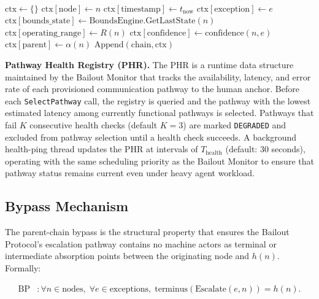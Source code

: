 \begin{algorithm}[htbp]
\begin{algorithmic}[1]
\EndProcedure
\\
  \State $\text{ctx} \leftarrow \{\}$
  \State $\text{ctx}[\text{node}] \leftarrow n$
  \State $\text{ctx}[\text{timestamp}] \leftarrow t_{\text{now}}$
  \State $\text{ctx}[\text{exception}] \leftarrow e$
  \State $\text{ctx}[\text{bounds\_state}] \leftarrow \text{BoundsEngine.GetLastState}(n)$
  \State $\text{ctx}[\text{operating\_range}] \leftarrow R(n)$
  \State $\text{ctx}[\text{confidence}] \leftarrow \text{confidence}(n, e)$
  \State $\text{ctx}[\text{parent}] \leftarrow \alpha(n)$
  \State $\text{Append}(\text{chain}, \text{ctx})$
\EndProcedure
\end{algorithmic}
\end{algorithm}

\medskip\noindent\textbf{Pathway Health Registry (PHR).} The PHR is a runtime data structure maintained by the Bailout Monitor that tracks the availability, latency, and error rate of each provisioned communication pathway to the human anchor. Before each \texttt{SelectPathway} call, the registry is queried and the pathway with the lowest estimated latency among currently functional pathways is selected. Pathways that fail $K$ consecutive health checks (default $K = 3$) are marked \texttt{DEGRADED} and excluded from pathway selection until a health check succeeds. A background health-ping thread updates the PHR at intervals of $T_{\text{health}}$ (default: 30 seconds), operating with the same scheduling priority as the Bailout Monitor to ensure that pathway status remains current even under heavy agent workload.

\subsection{Bypass Mechanism}\label{sec:bypass-mechanism}

The parent-chain bypass is the structural property that ensures the Bailout Protocol's escalation pathway contains no machine actors as terminal or intermediate absorption points between the originating node and $h(n)$. Formally:

\begin{align}
\text{BP} &: \forall n \in \text{nodes},\; \forall e \in \text{exceptions},\; \text{terminus}(\text{Escalate}(e, n)) = h(n). \tag{BP}
\end{align}

